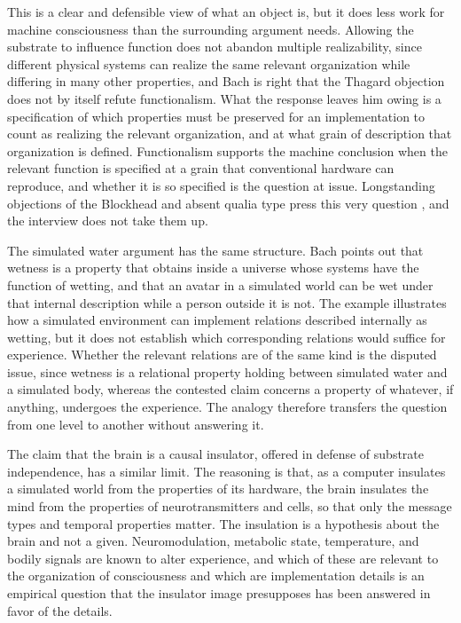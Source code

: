 \documentclass[11pt]{article}
\begin{document}
This is a clear and defensible view of what an object is, but it does less work for machine consciousness than the surrounding argument needs. Allowing the substrate to influence function does not abandon multiple realizability, since different physical systems can realize the same relevant organization while differing in many other properties, and Bach is right that the Thagard objection does not by itself refute functionalism. What the response leaves him owing is a specification of which properties must be preserved for an implementation to count as realizing the relevant organization, and at what grain of description that organization is defined. Functionalism supports the machine conclusion when the relevant function is specified at a grain that conventional hardware can reproduce, and whether it is so specified is the question at issue. Longstanding objections of the Blockhead and absent qualia type press this very question \cite{block1978,chalmers1995b}, and the interview does not take them up.

The simulated water argument has the same structure. Bach points out that wetness is a property that obtains inside a universe whose systems have the function of wetting, and that an avatar in a simulated world can be wet under that internal description while a person outside it is not. The example illustrates how a simulated environment can implement relations described internally as wetting, but it does not establish which corresponding relations would suffice for experience. Whether the relevant relations are of the same kind is the disputed issue, since wetness is a relational property holding between simulated water and a simulated body, whereas the contested claim concerns a property of whatever, if anything, undergoes the experience. The analogy therefore transfers the question from one level to another without answering it.

The claim that the brain is a causal insulator, offered in defense of substrate independence, has a similar limit. The reasoning is that, as a computer insulates a simulated world from the properties of its hardware, the brain insulates the mind from the properties of neurotransmitters and cells, so that only the message types and temporal properties matter. The insulation is a hypothesis about the brain and not a given. Neuromodulation, metabolic state, temperature, and bodily signals are known to alter experience, and which of these are relevant to the organization of consciousness and which are implementation details is an empirical question that the insulator image presupposes has been answered in favor of the details.
\end{document}
